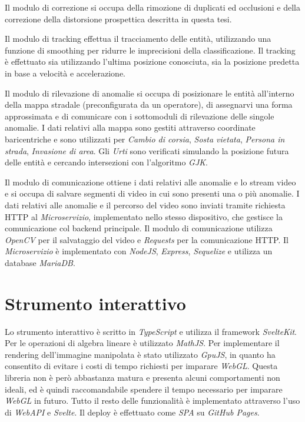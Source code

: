Il modulo di correzione si occupa della rimozione di duplicati ed occlusioni e della correzione della distorsione prospettica descritta in questa tesi.

Il modulo di tracking effettua il tracciamento delle entità, utilizzando una funzione di smoothing per ridurre le imprecisioni della classificazione.
Il tracking è effettuato sia utilizzando l'ultima posizione conosciuta, sia la posizione predetta in base a velocità e accelerazione.

Il modulo di rilevazione di anomalie si occupa di posizionare le entità all'interno della mappa stradale (preconfigurata da un operatore), di assegnarvi una forma approssimata e di comunicare con i sottomoduli di rilevazione delle singole anomalie.
I dati relativi alla mappa sono gestiti attraverso coordinate baricentriche e sono utilizzati per \emph{Cambio di corsia}, \emph{Sosta vietata}, \emph{Persona in strada}, \emph{Invasione di area}.
Gli \emph{Urti} sono verificati simulando la posizione futura delle entità e cercando intersezioni con l'algoritmo \emph{GJK}\cite{arch:gjk}.

Il modulo di comunicazione ottiene i dati relativi alle anomalie e lo stream video e si occupa di salvare segmenti di video in cui sono presenti una o più anomalie.
I dati relativi alle anomalie e il percorso del video sono inviati tramite richiesta HTTP al \emph{Microservizio}, implementato nello stesso dispositivo, che gestisce la comunicazione col backend principale.
Il modulo di comunicazione utilizza \emph{OpenCV}\cite{arch:opencv} per il salvataggio del video e \emph{Requests}\cite{arch:requests} per la comunicazione HTTP.
Il \emph{Microservizio} è implementato con \emph{NodeJS}\cite{arch:nodejs}, \emph{Express}\cite{arch:express}, \emph{Sequelize}\cite{arch:sequelize} e utilizza un database \emph{MariaDB}\cite{arch:mariadb}.

\section{Strumento interattivo}
Lo strumento interattivo è scritto in \emph{TypeScript}\cite{arch:typescript} e utilizza il framework \emph{SvelteKit}\cite{arch:sveltekit}.
Per le operazioni di algebra lineare è utilizzato \emph{MathJS}\cite{arch:mathjs}.
Per implementare il rendering dell'immagine manipolata è stato utilizzato \emph{GpuJS}\cite{arch:gpujs}, in quanto ha consentito di evitare i costi di tempo richiesti per imparare \emph{WebGL}\cite{arch:webgl}.
Questa libreria non è però abbastanza matura e presenta alcuni comportamenti non ideali, ed è quindi raccomandabile spendere il tempo necessario per imparare \emph{WebGL} in futuro.
Tutto il resto delle funzionalità è implementato attraverso l'uso di \emph{WebAPI}\cite{arch:webapi} e \emph{Svelte}\cite{arch:svelte}.
Il deploy è effettuato come \emph{SPA}\cite{arch:spa} su \emph{GitHub Pages}\cite{arch:ghpages}.
